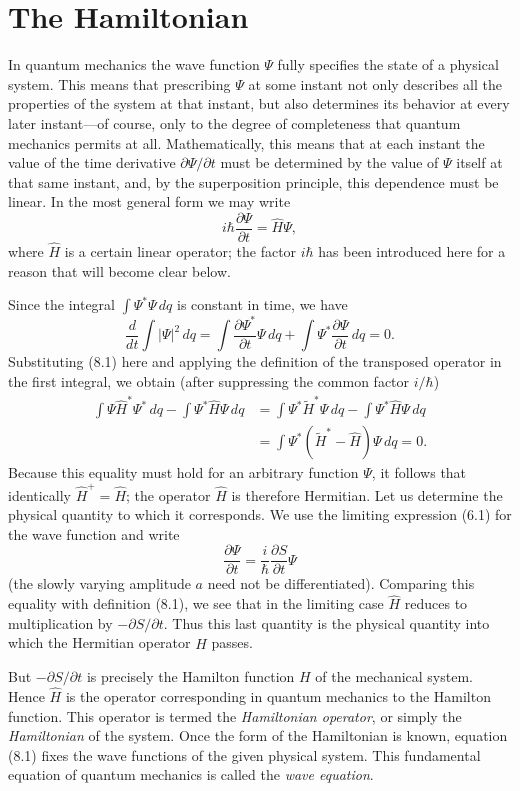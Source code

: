 \section{The Hamiltonian}

In quantum mechanics the wave function $\Psi$ fully specifies the state of a
physical system. This means that prescribing $\Psi$ at some instant not
only describes all the properties of the system at that instant, but also
determines its behavior at every later instant---of course, only to the degree
of completeness that quantum mechanics permits at all. Mathematically, this
means that at each instant the value of the time derivative
$\partial\Psi/\partial t$ must be determined by the value of $\Psi$ itself at
that same instant, and, by the superposition principle, this dependence must be
linear. In the most general form we may write
\begin{equation}
  i\hbar\frac{\partial\Psi}{\partial t}=\hat H\Psi,
  \tag{8.1}
\end{equation}
where $\hat H$ is a certain linear operator; the factor $i\hbar$ has been
introduced here for a reason that will become clear below.

Since the integral $\int\Psi^*\Psi\,dq$ is constant in time, we have
\[
  \frac{d}{dt}\int|\Psi|^2\,dq
  =\int\frac{\partial\Psi^*}{\partial t}\Psi\,dq
  +\int\Psi^*\frac{\partial\Psi}{\partial t}\,dq=0.
\]
Substituting (8.1) here and applying the definition of the transposed operator
in the first integral, we obtain (after suppressing the common factor
$i/\hbar$)
\[
  \begin{aligned}
    \int\Psi\hat H^*\Psi^*\,dq-\int\Psi^*\hat H\Psi\,dq
      &={}\int\Psi^*\tilde H^*\Psi\,dq
        -\int\Psi^*\hat H\Psi\,dq\\
      &=\int\Psi^*(\tilde H^*-\hat H)\Psi\,dq=0.
  \end{aligned}
\]
Because this equality must hold for an arbitrary function $\Psi$, it follows
that identically $\hat H^+=\hat H$; the operator $\hat H$ is therefore
Hermitian.
Let us determine the physical quantity to which it corresponds. We use the
limiting expression (6.1) for the wave function and write
\[
  \frac{\partial\Psi}{\partial t}
  =\frac{i}{\hbar}\frac{\partial S}{\partial t}\Psi
\]
(the slowly varying amplitude $a$ need not be differentiated). Comparing this
equality with definition (8.1), we see that in the limiting case $\hat H$
reduces to multiplication by $-\partial S/\partial t$. Thus this last quantity
is the physical quantity into which the Hermitian operator $\hat H$ passes.

But $-\partial S/\partial t$ is precisely the Hamilton function $H$ of the
mechanical system. Hence $\hat H$ is the operator corresponding in quantum
mechanics to the Hamilton function. This operator is termed the
\textit{Hamiltonian operator}, or simply the \textit{Hamiltonian} of the
system. Once the form of the Hamiltonian is known, equation (8.1) fixes the wave functions of the given
physical system. This fundamental equation of quantum mechanics is called the
\textit{wave equation}.
